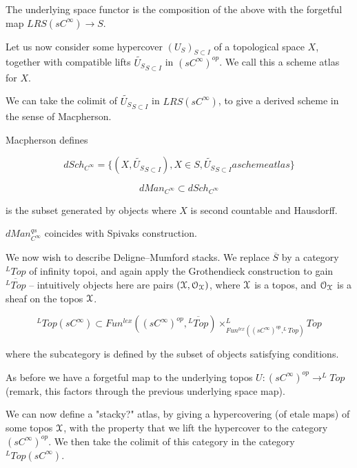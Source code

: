 The underlying space functor is the composition of the above with the forgetful map $LRS(sC^{\infty})\rightarrow S$.

Let us now consider some hypercover $(U_{S})_{S\subset I}$ of a topological space $X$, together with compatible lifts $\tilde{U_{S}}_{S\subset I}$ in $(sC^{\infty})^{op}$.  We call this a scheme atlas for $X$.

We can take the colimit of $\tilde{U_{S}}_{S\subset I}$ in $LRS(sC^{\infty})$, to give a derived scheme in the sense of Macpherson.

Macpherson defines

\[dSch_{C^{\infty}}=\{(X, \tilde{U_{S}}_{S\subset I}), X\in S, \tilde{U_{S}}_{S\subset I} a scheme atlas\}\]

\[dMan_{C^{\infty}}\subset dSch_{C^{\infty}}\]

is the subset generated by objects where $X$ is second countable and Hausdorff.

\begin{prop}
$dMan^{qs}_{C^{\infty}}$ coincides with Spivaks construction.
\end{prop}

We now wish to describe Deligne--Mumford stacks.  We replace $\overline{S}$ by a category $^{L}Top$ of infinity topoi, and again apply the Grothendieck construction to gain $\overline{^{L}Top}$ -- intuitively objects here are pairs $(\mathcal X,\mathcal O_{\mathcal X})$, where $\mathcal X$ is a topos, and $\mathcal O_{\mathcal X}$ is a sheaf on the topos $\mathcal X$.  

\[^{L}Top(sC^{\infty})\subset Fun^{lex}((sC^{\infty})^{op}, \overline{^{L}Top})\times_{Fun^{lex}((sC^{\infty})^{op},^{L}Top)}^{L}Top\]

where the subcategory is defined by the subset of objects satisfying  conditions.

As before we have a forgetful map to the underlying topos $U:(sC^{\infty})^{op}\rightarrow ^{L}Top$ (remark, this factors through the previous underlying space map).

We can now define a "stacky?" atlas, by giving a hypercovering (of etale maps) of some topos $\mathcal X$, with the property that we lift the hypercover to the category $(sC^{\infty})^{op}$.  We then take the colimit of this category in the category $^{L}Top(sC^{\infty})$.
